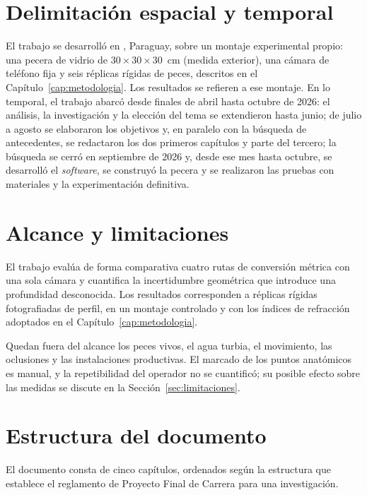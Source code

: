 \section{Delimitación espacial y temporal}
\label{sec:delimitacion}

El trabajo se desarrolló en \Ciudad, Paraguay, sobre un montaje experimental propio: una pecera de vidrio de \mbox{$30 \times 30 \times 30$}~cm (medida exterior), una cámara de teléfono fija y seis réplicas rígidas de peces, descritos en el Capítulo~\ref{cap:metodologia}. Los resultados se refieren a ese montaje. En lo temporal, el trabajo abarcó desde finales de abril hasta octubre de 2026: el análisis, la investigación y la elección del tema se extendieron hasta junio; de julio a agosto se elaboraron los objetivos y, en paralelo con la búsqueda de antecedentes, se redactaron los dos primeros capítulos y parte del tercero; la búsqueda se cerró en septiembre de 2026 y, desde ese mes hasta octubre, se desarrolló el \emph{software}, se construyó la pecera y se realizaron las pruebas con materiales y la experimentación definitiva.

\section{Alcance y limitaciones}
\label{sec:alcance}

El trabajo evalúa de forma comparativa cuatro rutas de conversión métrica con una sola cámara y cuantifica la incertidumbre geométrica que introduce una profundidad desconocida. Los resultados corresponden a réplicas rígidas fotografiadas de perfil, en un montaje controlado y con los índices de refracción adoptados en el Capítulo~\ref{cap:metodologia}.

Quedan fuera del alcance los peces vivos, el agua turbia, el movimiento, las oclusiones y las instalaciones productivas. El marcado de los puntos anatómicos es manual, y la repetibilidad del operador no se cuantificó; su posible efecto sobre las medidas se discute en la Sección~\ref{sec:limitaciones}.

\section{Estructura del documento}

El documento consta de cinco capítulos, ordenados según la estructura que establece el reglamento de Proyecto Final de Carrera para una investigación.


